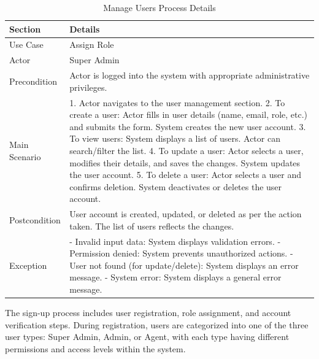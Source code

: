 \begin{table}[htbp]
    \centering
    \begin{tabular}{|l|p{}|}
        \hline
        \textbf{Section} & \textbf{Details} \\
        \hline
        Use Case & Assign Role \\
        \hline
        Actor & Super Admin \\
        \hline
        Precondition & Actor is logged into the system with appropriate administrative privileges. \\
        \hline
        Main Scenario & 
        1. Actor navigates to the user management section.
        2. To create a user: Actor fills in user details (name, email, role, etc.) and submits the form. System creates the new user account.
        3. To view users: System displays a list of users. Actor can search/filter the list.
        4. To update a user: Actor selects a user, modifies their details, and saves the changes. System updates the user account.
        5. To delete a user: Actor selects a user and confirms deletion. System deactivates or deletes the user account. \\
        \hline
        Postcondition & User account is created, updated, or deleted as per the action taken. The list of users reflects the changes. \\
        \hline
        Exception & 
        - Invalid input data: System displays validation errors.
        - Permission denied: System prevents unauthorized actions.
        - User not found (for update/delete): System displays an error message.
        - System error: System displays a general error message. \\
        \hline
    \end{tabular}
    \caption{Manage Users Process Details}
    \label{tab:manage_users_process}
\end{table}


The sign-up process includes user registration, role assignment, and account verification steps. During registration, users are categorized into one of the three user types: Super Admin, Admin, or Agent, with each type having different permissions and access levels within the system.

\newpage    

